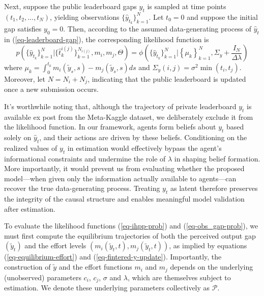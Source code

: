 \documentclass[mnsc]{informs3}
\begin{document}
Next, suppose the public leaderboard gaps $\hat{y}_t$ is sampled at time points $(t_1, t_2, ..., t_N)$, yielding observations $\{\hat{y}_{t_k}\}^N_{k=1}$. 
Let $t_0 = 0$ and suppose the initial gap satisfies $y_0 = 0$. 
Then, according to the assumed data-generating process of $\hat{y}_t$ in (\ref{eq-leaderboard-gap}), the corresponding likelihood function is
\begin{equation}\label{eq-obs_gap-prob}
p\left(\{\hat{y}_{t_k}\}_{k=1}^N | \{\hat{t}^{i(j)}_k\}_{k=1}^{N_{i(j)}}, m_i, m_j, \Theta\right) = 
\phi\left(\{\hat{y}_{t_k}\}_{k=1}^N | \left\{\mu_k\right\}^N_{k=1}, \Sigma_y+\frac{I_N}{\Delta\lambda}\right)
\end{equation}
where $\mu_k = \int_{0}^{t_{k}}m_i(\tilde{y}_s, s) - m_j(\tilde{y}_s, s)ds$ and $\Sigma_y(i, j) = \sigma^2\min(t_i,t_j)$. 
Moreover, let $N = N_i + N_j$, indicating that the public leaderboard is updated once a new submission occurs. 

It's worthwhile noting that, although the trajectory of private leaderboard $y_t$ is available ex post from the Meta-Kaggle dataset, we deliberately exclude it from the likelihood function. 
In our framework, agents form beliefs about $y_t$ based solely on $\hat{y}_t$, and their actions are driven by these beliefs. 
Conditioning on the realized values of $y_t$ in estimation would effectively bypass the agent’s informational constraints and undermine the role of $\lambda$ in shaping belief formation. 
More importantly, it would prevent us from evaluating whether the proposed model—when given only the information actually available to agents—can recover the true data-generating process. 
Treating $y_t$ as latent therefore preserves the integrity of the causal structure and enables meaningful model validation after estimation.

To evaluate the likelihood functions (\ref{eq-ihpp-prob}) and (\ref{eq-obs_gap-prob}), we must first compute the equilibrium trajectories of both the perceived output gap $(\tilde{y}_t)$ and the effort levels $(m_i(\tilde{y}_t, t), m_j(\tilde{y}_t, t))$, as implied by equations (\ref{eq-equilibrium-effort}) and (\ref{eq-fintered-y-update}). 
Importantly, the construction of $\tilde{y}$ and the effort functions $m_i$ and $m_j$ depends on the underlying (unobserved) parameters $c_i$, $c_j$, $\sigma$ and $\lambda$, which are themselves subject to estimation.
We denote these underlying parameters collectively as $\mathcal{P}$. 
\end{document}
